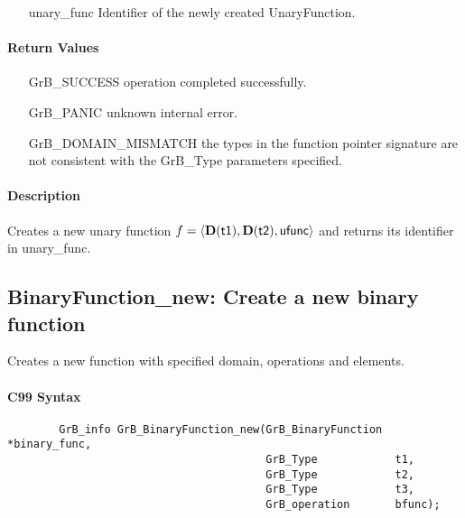\begin{itemize}[leftmargin=1.1in]
    \item[{\sf unary\_func}] Identifier of the newly created UnaryFunction.
\end{itemize}

\paragraph{Return Values}

\begin{itemize}[leftmargin=2.1in]
\item[{\sf GrB\_SUCCESS}]           operation completed successfully.
\item[{\sf GrB\_PANIC}]             unknown internal error.
\item[{\sf GrB\_DOMAIN\_MISMATCH}]  the types in the function pointer signature are not   
                                    consistent with the {\sf GrB\_Type} parameters specified.
\end{itemize}

\paragraph{Description}

Creates a new unary function $f = \langle \bold{D}({\sf t1}), \bold{D}({\sf t2}),
 {\sf ufunc} \rangle$ and returns its identifier in {\sf unary\_func}.


\subsection{{\sf BinaryFunction\_new}: Create a new binary function}

Creates a new function with specified domain, operations and elements.

\paragraph{C99 Syntax}

\begin{verbatim}
        GrB_info GrB_BinaryFunction_new(GrB_BinaryFunction *binary_func,
                                        GrB_Type            t1,
                                        GrB_Type            t2,
                                        GrB_Type            t3,
                                        GrB_operation       bfunc);
\end{verbatim}

